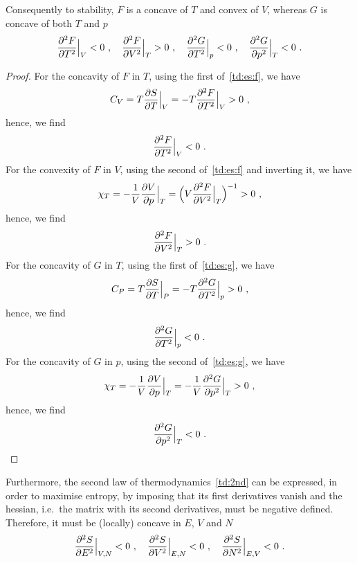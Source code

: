     Consequently to stability, $F$ is a concave of $T$ and convex of $V$, whereas $G$ is concave of both $T$ and $p$
    \begin{equation*}
        \frac{\partial^2 F}{\partial T^2} \Big \vert_V < 0 ~, \quad \frac{\partial^2 F}{\partial V^2} \Big \vert_T > 0 ~, \quad \frac{\partial^2 G}{\partial T^2} \Big \vert_p < 0 ~, \quad \frac{\partial^2 G}{\partial p^2} \Big \vert_T < 0 ~.
    \end{equation*}
    \begin{proof}
        For the concavity of $F$ in $T$, using the first of~\eqref{td:es:f}, we have
        \begin{equation*}
            C_V = T \frac{\partial S}{\partial T} \Big \vert_{V} = - T \frac{\partial^2 F}{\partial T^2} \Big \vert_V > 0 ~,
        \end{equation*}
        hence, we find
        \begin{equation*}
            \frac{\partial^2 F}{\partial T^2} \Big \vert_V < 0 ~.
        \end{equation*}
        For the convexity of $F$ in $V$, using the second of~\eqref{td:es:f} and inverting it, we have
        \begin{equation*}
            \chi_T = - \frac{1}{V} \frac{\partial V}{\partial p} \Big \vert_T = \Big ( V \frac{\partial^2 F}{\partial V^2} \Big \vert_T \Big)^{-1} > 0 ~,
        \end{equation*}
        hence, we find
        \begin{equation*}
            \frac{\partial^2 F}{\partial V^2} \Big \vert_T > 0 ~.
        \end{equation*}
        For the concavity of $G$ in $T$, using the first of~\eqref{td:es:g}, we have
        \begin{equation*}
            C_P = T \frac{\partial S}{\partial T} \Big \vert_{P} = - T \frac{\partial^2 G}{\partial T^2} \Big \vert_p > 0 ~,
        \end{equation*}
        hence, we find
        \begin{equation*}
            \frac{\partial^2 G}{\partial T^2} \Big \vert_p < 0 ~.
        \end{equation*}
        For the concavity of $G$ in $p$, using the second of~\eqref{td:es:g}, we have
        \begin{equation*}
            \chi_T = - \frac{1}{V} \frac{\partial V}{\partial p} \Big \vert_T = - \frac{1}{V} \frac{\partial^2 G}{\partial p^2} \Big \vert_T > 0 ~,
        \end{equation*}
        hence, we find
        \begin{equation*}
            \frac{\partial^2 G}{\partial p^2} \Big \vert_T < 0 ~.
        \end{equation*}
    \end{proof}
    Furthermore, the second law of thermodynamics~\eqref{td:2nd} can be expressed, in order to maximise entropy, by imposing that its first derivatives vanish and the hessian, i.e.~the matrix with its second derivatives, must be negative defined. Therefore, it must be (locally) concave in $E$, $V$ and $N$
    \begin{equation*}
        \frac{\partial^2 S}{\partial E^2} \Big \vert_{V, N} < 0 ~, \quad \frac{\partial^2 S}{\partial V^2} \Big \vert_{E, N} < 0 ~, \quad \frac{\partial^2 S}{\partial N^2} \Big \vert_{E, V} < 0 ~.
    \end{equation*}

